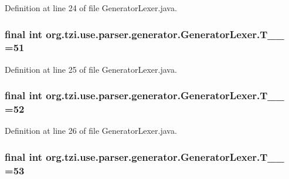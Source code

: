 Definition at line 24 of file Generator\-Lexer.\-java.

\hypertarget{classorg_1_1tzi_1_1use_1_1parser_1_1generator_1_1_generator_lexer_a9a6a101ee3dcf65fba0243279a247570}{
\subsubsection[{T\-\_\-\-\_\-51}]{\setlength{\rightskip}{0pt plus 5cm}final int org.\-tzi.\-use.\-parser.\-generator.\-Generator\-Lexer.\-T\-\_\-\-\_ =51\hspace{0.3cm}{\ttfamily [static]}}}\label{classorg_1_1tzi_1_1use_1_1parser_1_1generator_1_1_generator_lexer_a9a6a101ee3dcf65fba0243279a247570}


Definition at line 25 of file Generator\-Lexer.\-java.

\hypertarget{classorg_1_1tzi_1_1use_1_1parser_1_1generator_1_1_generator_lexer_a2391c46a62f07ec3ef3f06f492ae39e2}{
\subsubsection[{T\-\_\-\-\_\-52}]{\setlength{\rightskip}{0pt plus 5cm}final int org.\-tzi.\-use.\-parser.\-generator.\-Generator\-Lexer.\-T\-\_\-\-\_ =52\hspace{0.3cm}{\ttfamily [static]}}}\label{classorg_1_1tzi_1_1use_1_1parser_1_1generator_1_1_generator_lexer_a2391c46a62f07ec3ef3f06f492ae39e2}


Definition at line 26 of file Generator\-Lexer.\-java.

\hypertarget{classorg_1_1tzi_1_1use_1_1parser_1_1generator_1_1_generator_lexer_a0df8c9216f1abb5137925c58a23e529f}{
\subsubsection[{T\-\_\-\-\_\-53}]{\setlength{\rightskip}{0pt plus 5cm}final int org.\-tzi.\-use.\-parser.\-generator.\-Generator\-Lexer.\-T\-\_\-\-\_ =53\hspace{0.3cm}{\ttfamily [static]}}}\label{classorg_1_1tzi_1_1use_1_1parser_1_1generator_1_1_generator_lexer_a0df8c9216f1abb5137925c58a23e529f}


